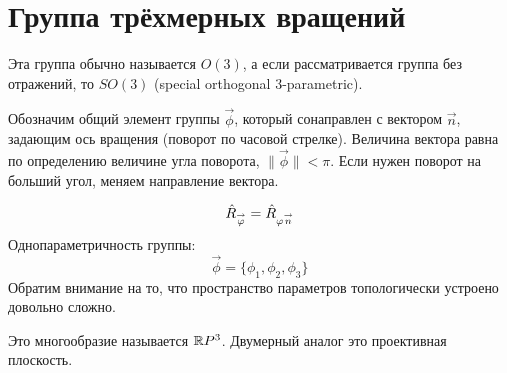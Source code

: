 \section{Группа трёхмерных вращений}
Эта группа обычно называется $O(3)$, а если рассматривается группа без отражений, то $SO(3)$ (special orthogonal 3-parametric).


\Ans Обозначим общий элемент группы $\vec \phi$, который сонаправлен с вектором $\vec n$, задающим ось вращения (поворот по часовой стрелке). Величина вектора равна по определению величине угла поворота, $\|\vec \phi\| < \pi$. Если нужен поворот на больший угол, меняем направление вектора.

$$
    \Hat R_{\vec \phi} = \Hat R_{\phi \vec n}
$$ 
Однопараметричность группы:
$$
    \vec \phi = \{\phi_1, \phi_2, \phi_3\}
$$
Обратим внимание на то, что пространство параметров топологически устроено довольно сложно.

Это многообразие называется $\R P^3$. Двумерный аналог это проективная плоскость.

